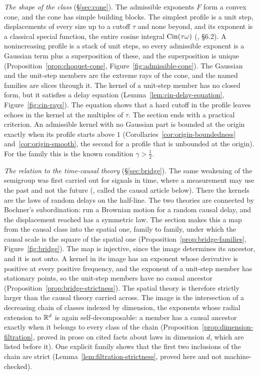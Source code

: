 \emph{The shape of the class} (\S\ref{sec:cone}). The admissible exponents $F$ form a convex
cone, and the cone has simple building blocks. The simplest profile is a unit step,
displacements of every size up to a cutoff $\tau$ and none beyond, and its exponent is a
classical special function, the entire cosine integral $\operatorname{Cin}(\tau\omega)$
(, \S6.2). A nonincreasing profile is a stack of unit
steps, so every admissible exponent is a Gaussian term plus a superposition of these, and the
superposition is unique (Proposition~\ref{prop:choquet-cone}, Figure~\ref{fig:admissible-cone}).
The Gaussian and the unit-step members are the extreme rays of the cone, and the named
families are slices through it. The kernel of a unit-step member has no closed form, but it
satisfies a delay equation (Lemma~\ref{lem:cin-delay-equation}, Figure~\ref{fig:cin-rays}).
The equation shows that a hard cutoff in the profile leaves echoes in the kernel at the
multiples of $\tau$. The section ends with a practical criterion. An admissible kernel with no
Gaussian part is bounded at the origin exactly when its profile starts above $1$
(Corollaries~\ref{cor:origin-boundedness} and~\ref{cor:origin-smooth}, the second for a
profile that is unbounded at the origin). For the
\Matern{} family this is the known condition $\gamma > \tfrac12$.

\emph{The relation to the time-causal theory} (\S\ref{sec:bridge}). The same weakening of the
semigroup was first carried out for signals in time, where a measurement may use the past and
not the future (, called the causal article below). There the
kernels are the laws of random delays on the half-line. The two theories are connected by
Bochner's subordination: run a Brownian motion for a random causal delay, and the displacement
reached has a symmetric law. The section makes this a map from the causal class into the
spatial one, family to family, under which the causal scale is the square of the spatial one
(Proposition~\ref{prop:bridge-families}, Figure~\ref{fig:bridge}). The map is injective, since
the image determines its ancestor, and it is not onto. A kernel in its image has an exponent
whose derivative is positive at every positive frequency, and the exponent of a unit-step
member has stationary points, so the unit-step members have no causal ancestor
(Proposition~\ref{prop:bridge-strictness}). The spatial theory is therefore strictly larger
than the causal theory carried across. The image is the intersection of a decreasing chain of
classes indexed by dimension, the exponents whose radial extension to $\mathbb{R}^d$ is again
self-decomposable: a member has a causal ancestor exactly when it belongs to every class of
the chain (Proposition~\ref{prop:dimension-filtration}, proved in prose on cited facts about
laws in dimension $d$, which are listed before it). One explicit family shows that the first
two inclusions of the chain are strict (Lemma~\ref{lem:filtration-strictness}, proved here and
not machine-checked).

